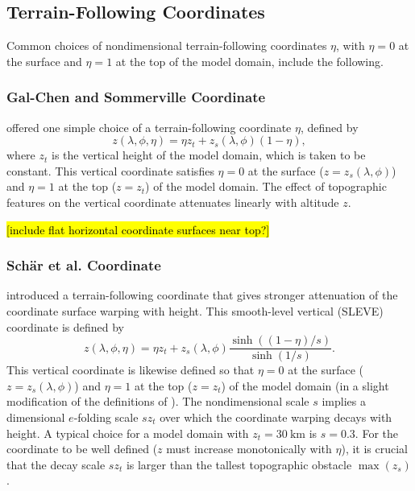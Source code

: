 \documentclass{report}
\begin{document}
\subsection{Terrain-Following Coordinates}

Common choices of nondimensional terrain-following coordinates $\eta$, with $\eta=0$ at the surface and $\eta=1$ at the top of the model domain, include the following.

\subsubsection{Gal-Chen and Sommerville Coordinate} \citet{Gal-Chen75a} offered one simple choice of a terrain-following coordinate $\eta$, defined by 
\begin{equation}\label{e:Gal-Chen}
    z(\lambda, \phi, \eta) = \eta z_t + z_s(\lambda, \phi)(1 - \eta),
\end{equation}
where $z_t$ is the vertical height of the model domain, which is taken to be constant. This vertical coordinate satisfies $\eta = 0$ at the surface ($z=z_s(\lambda, \phi)$) and $\eta = 1$ at the top ($z=z_t$) of the model domain. The effect of topographic features on the vertical coordinate attenuates linearly with altitude $z$. 

\hl{[include flat horizontal coordinate surfaces near top?]}

\subsubsection{Sch\"ar et al. Coordinate} \citet{Schar02a} introduced a terrain-following coordinate that gives stronger attenuation of the coordinate surface warping with height. This smooth-level vertical (SLEVE) coordinate is defined by
\begin{equation}\label{e:Schaer}
    z(\lambda, \phi, \eta) = \eta z_t + z_s(\lambda,\phi) \frac{\sinh\left((1-\eta)/s\right)}{\sinh(1/s)}.
\end{equation}
This vertical coordinate is likewise defined so that  $\eta = 0$ at the surface ($z=z_s(\lambda, \phi)$) and $\eta = 1$ at the top ($z=z_t$) of the model domain (in a slight modification of the definitions of \citet{Schar02a}). The nondimensional scale $s$ implies a dimensional $e$-folding scale $s z_t$ over which the coordinate warping decays with height. A typical choice for a model domain with $z_t = 30~\mathrm{km}$ is $s = 0.3$. For the coordinate to be well defined ($z$ must increase monotonically with $\eta$), it is crucial that the decay scale $s z_t$ is larger than the tallest topographic obstacle $\max(z_s)$. 
\end{document}
